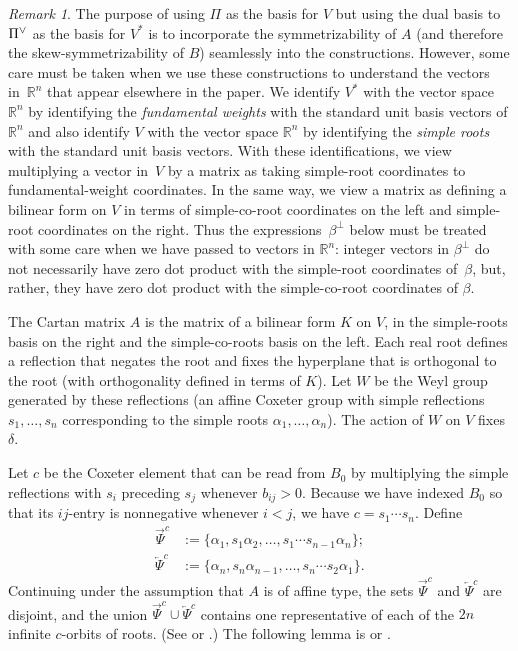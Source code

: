 \documentclass[10pt]{article}
\theoremstyle{definition}
\theoremstyle{remark}
\newtheorem{remark}[proposition]{Remark}
\numberwithin{equation}{section}
\newcommand{\reals}{\mathbb R}
\newcommand{\set}[1]{{\lbrace #1 \rbrace}}
\newcommand{\ck}{\spcheck}
\newcommand{\0}{{\mathbf{0}}}
\newcommand{\SimplesChar}{\Pi}
\newcommand{\Simples}{\SimplesChar}
\newcommand{\TravInfChar}{\Psi}
\newcommand{\TravProj}[1]{\overrightarrow{\TravInfChar}^{#1}}
\newcommand{\TravInj}[1]{\overleftarrow{\TravInfChar}^{#1}}
\begin{document}
\begin{remark}\label{danger: co-roots}
The purpose of using $\Simples$ as the basis for $V$ but using the dual basis to $\Simples\ck$ as the basis for $V^*$ is to incorporate the symmetrizability of $A$ (and therefore the skew-symmetrizability of $B$) seamlessly into the constructions.
However, some care must be taken when we use these constructions to understand the vectors in~$\reals^n$ that appear elsewhere in the paper.
We identify $V^*$ with the vector space $\reals^n$ by identifying the \emph{fundamental weights} with the standard unit basis vectors of $\reals^n$ and also identify $V$ with the vector space $\reals^n$ by identifying the \emph{simple roots} with the standard unit basis vectors.
With these identifications, we view multiplying a vector in~$V$ by a matrix as taking simple-root coordinates to fundamental-weight coordinates.
In the same way, we view a matrix as defining a bilinear form on $V$ in terms of simple-co-root coordinates on the left and simple-root coordinates on the right.
Thus the expressions~$\beta^\perp$ below must be treated with some care when we have passed to vectors in $\reals^n$:
integer vectors in $\beta^\perp$ do not necessarily have zero dot product with the simple-root coordinates of~$\beta$, but, rather, they have zero dot product with the simple-co-root coordinates of $\beta$.
\end{remark}

The Cartan matrix $A$ is the matrix of a bilinear form $K$ on $V$, in the simple-roots basis on the right and the simple-co-roots basis on the left.
Each real root defines a reflection that negates the root and fixes the hyperplane that is orthogonal to the root (with orthogonality defined in terms of $K$).
Let $W$ be the Weyl group generated by these reflections (an affine Coxeter  group with simple reflections $s_1,\ldots,s_n$ corresponding to the simple roots $\alpha_1,\ldots,\alpha_n$).
The action of $W$ on $V$ fixes~$\delta$.

Let $c$ be the Coxeter element that can be read from $B_0$ by multiplying the simple reflections with $s_i$ preceding $s_j$ whenever $b_{ij}>0$.
Because we have indexed $B_0$ so that its $ij$-entry is nonnegative whenever $i<j$, we have $c=s_1\cdots s_n$. 
Define
\begin{align}
\label{rep->}
\TravProj{c}&:=\set{\alpha_1,s_1\alpha_2,\ldots,s_1\cdots s_{n-1}\alpha_n};\\
\label{rep<-}
\TravInj{c}&:=\set{\alpha_n,s_n\alpha_{n-1},\ldots,s_n\cdots s_2\alpha_1}.
\end{align}%
Continuing under the assumption that $A$ is of affine type, the sets $\TravProj{c}$ and $\TravInj{c}$ are disjoint, and the union $\TravProj{c}\cup\TravInj{c}$ contains one representative of each of the $2n$ infinite $c$-orbits of roots.
(See \cite[Chapter~1]{Dlab-Ringel} or \cite[Theorem~1.2]{afforb}.)
The following lemma is \cite[Lemma~1.6]{Dlab-Ringel} or \cite[Lemma~4.1]{afforb}.
\end{document}
